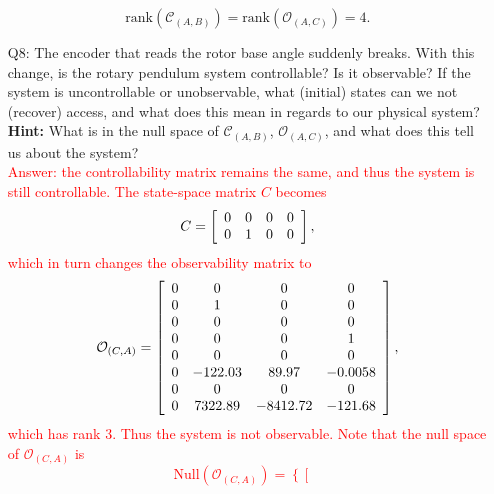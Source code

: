 \documentclass[12pt]{report}
\newcommand\drew[1]{\textcolor{red}{#1}}
\begin{document}
\begin{enumerate}[Question]
{              \[
                  \text{rank}(\mathcal{C}_{(A,B)}) = \text{rank}(\mathcal{O}_{(A,C)})=4.
              \]}
    \item[Q8:] The encoder that reads the rotor base angle suddenly breaks. With this change, is the rotary pendulum system controllable? Is it observable? If the system is uncontrollable or unobservable, what (initial) states can we not (recover) access, and what does this mean in regards to our physical system?\\
          \textbf{Hint:} What is in the null space of $\mathcal{C}_{(A,B)}$, $\mathcal{O}_{(A,C)}$, and what does this tell us about the system?\\
          \drew{Answer: the controllability matrix remains the same, and thus the system is still controllable. The state-space matrix $C$ becomes
              \[
                  C =
                  \left[\begin{array}{c c c c}
                          0 & 0 & 0 & 0 \\
                          0 & 1 & 0 & 0
                      \end{array}\right],
              \]
              which in turn changes the observability matrix to
              \[
                  \mathcal{O}_{(C,A)} =
                  \left[\begin{array}{c c c c}
                          0 & 0       & 0        & 0       \\
                          0 & 1       & 0        & 0       \\
                          0 & 0       & 0        & 0       \\
                          0 & 0       & 0        & 1       \\
                          0 & 0       & 0        & 0       \\
                          0 & -122.03 & 89.97    & -0.0058 \\
                          0 & 0       & 0        & 0       \\
                          0 & 7322.89 & -8412.72 & -121.68 \\
                      \end{array}\right],
              \]
              which has rank 3. Thus the system is not observable. Note that the null space of $\mathcal{O}_{(C,A)}$ is
              \[
                  \mathrm{Null}(\mathcal{O}_{(C,A)}) =
                  \left\{\left[\begin{array}{c}

\end{array}\]}
\end{enumerate}
\end{document}
